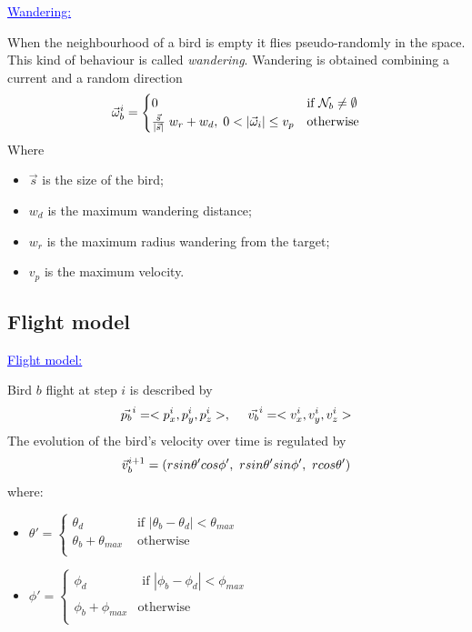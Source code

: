 \documentclass{beamer}
\begin{document}
\begin{frame}
\textcolor{blue}{\underline{Wandering:}}

When the neighbourhood  of a bird is empty it flies pseudo-randomly in the space. This kind of behaviour is called \textit{wandering}. 
Wandering is obtained combining a current and a random direction 
\begin{equation}
    \vec{\omega}_b^i =  
		\begin{cases} 
			0 & \mbox{if } \mathcal{N}_b \neq \emptyset \\ 
			\frac{\vec{s}}{|\vec{s}|}\;w_r+w_d,\; 0 < |\vec{\omega}_i| \leq v_p &  \mbox{otherwise}  \notag
		\end{cases}
\end{equation}
Where 
\begin{itemize}
\item $\vec{s}$ is the size of the bird;
\item $w_d$ is the maximum wandering distance;
\item $w_r$ is the maximum radius wandering from the target;
\item $v_p$ is the maximum velocity.
\end{itemize}

\end{frame}

\subsection{Flight model}
\begin{frame}
\textcolor{blue}{\underline{Flight model:}}

Bird $b$ flight at step $i$ is described by 
\begin{equation}
\vec{ p_b}^i = < p_x^i , p_y^i , p_z^i >, \ \ \ \ \vec{v_b}^i = < v_x^i , v_y^i , v_z^i > \notag
\end{equation}
The evolution of the bird's velocity over time is regulated
by 
\begin{equation}
\vec{v}_b^{i+1} = (r sin\theta' cos \phi', \ r sin\theta' sin \phi', \ r cos \theta') \notag
\end{equation}
where:
\begin{itemize}
  \item $
     \theta' = \begin{cases}
    \theta_d &\mbox{ if }  |\theta_b - \theta_d| < \theta_{max}\\
    \theta_b + \theta_{max} &\mbox{ otherwise }\\
    \end{cases}
  $ \hfill \\
  \medskip
    \item $
     \phi' = \begin{cases}
    \phi_d &\mbox{ if }  |\phi_b - \phi_d| < \phi_{max}\\
     \\
    \phi_b + \phi_{max} &\mbox{otherwise}\\
    \end{cases}
  $ \hfill \\ 
\end{itemize}
\end{frame}
   
\end{document}
